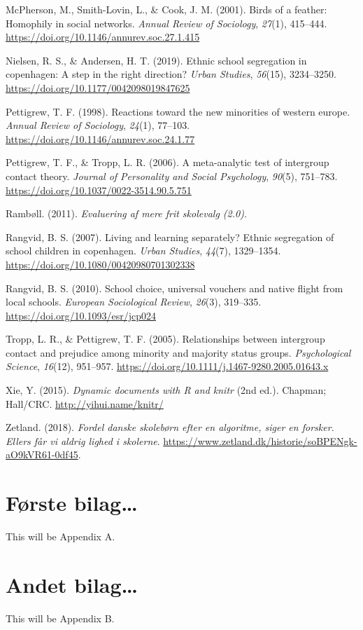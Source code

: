 \documentclass[
]{book}
\newlength{\cslhangindent}
\newenvironment{CSLReferences}[2] %
 {\begin{list}{}{%
  \setlength{\itemindent}{0pt}
  \setlength{\leftmargin}{0pt}
  \setlength{\parsep}{0pt}
  \ifodd #1
   \setlength{\leftmargin}{\cslhangindent}
   \setlength{\itemindent}{-1\cslhangindent}
  \fi
  \setlength{\itemsep}{#2\baselineskip}}}
 {\end{list}}
\begin{document}
\begin{CSLReferences}{1}{0}
McPherson, M., Smith-Lovin, L., \& Cook, J. M. (2001). Birds of a feather: Homophily in social networks. \emph{Annual Review of Sociology}, \emph{27}(1), 415--444. \url{https://doi.org/10.1146/annurev.soc.27.1.415}

Nielsen, R. S., \& Andersen, H. T. (2019). Ethnic school segregation in copenhagen: A step in the right direction? \emph{Urban Studies}, \emph{56}(15), 3234--3250. \url{https://doi.org/10.1177/0042098019847625}

Pettigrew, T. F. (1998). Reactions toward the new minorities of western europe. \emph{Annual Review of Sociology}, \emph{24}(1), 77--103. \url{https://doi.org/10.1146/annurev.soc.24.1.77}

Pettigrew, T. F., \& Tropp, L. R. (2006). A meta-analytic test of intergroup contact theory. \emph{Journal of Personality and Social Psychology}, \emph{90}(5), 751--783. \url{https://doi.org/10.1037/0022-3514.90.5.751}

Rambøll. (2011). \emph{Evaluering af mere frit skolevalg (2.0)}.

Rangvid, B. S. (2007). Living and learning separately? Ethnic segregation of school children in copenhagen. \emph{Urban Studies}, \emph{44}(7), 1329--1354. \url{https://doi.org/10.1080/00420980701302338}

Rangvid, B. S. (2010). School choice, universal vouchers and native flight from local schools. \emph{European Sociological Review}, \emph{26}(3), 319--335. \url{https://doi.org/10.1093/esr/jcp024}

Tropp, L. R., \& Pettigrew, T. F. (2005). Relationships between intergroup contact and prejudice among minority and majority status groups. \emph{Psychological Science}, \emph{16}(12), 951--957. \url{https://doi.org/10.1111/j.1467-9280.2005.01643.x}

Xie, Y. (2015). \emph{Dynamic documents with {R} and knitr} (2nd ed.). Chapman; Hall/CRC. \url{http://yihui.name/knitr/}

Zetland. (2018). \emph{Fordel danske skolebørn efter en algoritme, siger en forsker. Ellers får vi aldrig lighed i skolerne}. \url{https://www.zetland.dk/historie/soBPENgk-aO9kVR61-0df45}.

\end{CSLReferences}

\appendix


\chapter{Første bilag\ldots{}}\label{bilag1}

This will be Appendix A.

\chapter{Andet bilag\ldots{}}\label{bilag2}

This will be Appendix B.
\end{document}
